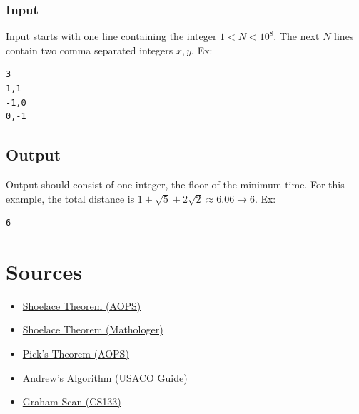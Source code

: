 \documentclass{article}
\begin{document}
\subsubsection{Input}
Input starts with one line containing the integer $1<N<10^{8}$. The next $N$ lines contain two comma separated integers $x,y$. Ex:
\begin{lstlisting}
3
1,1
-1,0
0,-1
\end{lstlisting}
\subsection{Output}
Output should consist of one integer, the floor of the minimum time. For this example, the total distance is $1+\sqrt{5}+2\sqrt{2}\approx6.06\rightarrow 6$. Ex:
\begin{lstlisting}
6
\end{lstlisting}

\section{Sources}
\begin{itemize}
    \item \href{https://artofproblemsolving.com/wiki/index.php/Shoelace_Theorem}{Shoelace Theorem (AOPS)}
    \item \href{https://www.youtube.com/watch?v=0KjG8Pg6LGk}{Shoelace Theorem (Mathologer)}
    \item \href{https://artofproblemsolving.com/wiki/index.php/Pick's_Theorem}{Pick's Theorem (AOPS)}
    
    \item \href{https://usaco.guide/CPH.pdf#page=288}{Andrew's Algorithm (USACO Guide)}
    \item \href{https://www.cs.ucr.edu/~eldawy/19SCS133/slides/CS133-04-ConvexHull.pdf}{Graham Scan (CS133)}

\end{itemize}
\end{document}
